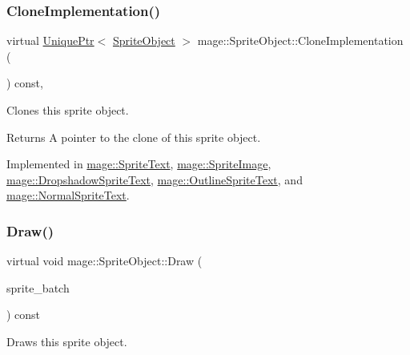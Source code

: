 \subsubsection{\texorpdfstring{Clone\+Implementation()}{CloneImplementation()}}
{\footnotesize\ttfamily virtual \hyperlink{namespacemage_a3316d7143a973e37adf1110f2e80ca31}{Unique\+Ptr}$<$ \hyperlink{classmage_1_1_sprite_object}{Sprite\+Object} $>$ mage\+::\+Sprite\+Object\+::\+Clone\+Implementation (\begin{DoxyParamCaption}{ }\end{DoxyParamCaption}) const\hspace{0.3cm}{\ttfamily [private]}, {}}

Clones this sprite object.

\begin{DoxyReturn}{Returns}
A pointer to the clone of this sprite object. 
\end{DoxyReturn}


Implemented in \hyperlink{classmage_1_1_sprite_text_a2b9f59a1730f8b9691f173251a2b4944}{mage\+::\+Sprite\+Text}, \hyperlink{classmage_1_1_sprite_image_a61e61349fd3435616893aae787feff37}{mage\+::\+Sprite\+Image}, \hyperlink{classmage_1_1_dropshadow_sprite_text_ae4b94b4120a9cae6bae11b61e7aed39b}{mage\+::\+Dropshadow\+Sprite\+Text}, \hyperlink{classmage_1_1_outline_sprite_text_af8d29408abb61c05a23499bf37c4c7b0}{mage\+::\+Outline\+Sprite\+Text}, and \hyperlink{classmage_1_1_normal_sprite_text_a261996eafdc02f39c6c57eb2b7ec2cea}{mage\+::\+Normal\+Sprite\+Text}.

\hypertarget{classmage_1_1_sprite_object_a1c1c885fe7846f7ee1cc0b73571c2fa0}{}\label{classmage_1_1_sprite_object_a1c1c885fe7846f7ee1cc0b73571c2fa0} 
\subsubsection{\texorpdfstring{Draw()}{Draw()}}
{\footnotesize\ttfamily virtual void mage\+::\+Sprite\+Object\+::\+Draw (\begin{DoxyParamCaption}\item[{Sprite\+Batch \&}]{sprite\+\_\+batch }\end{DoxyParamCaption}) const\hspace{0.3cm}{\ttfamily [pure virtual]}}

Draws this sprite object.


